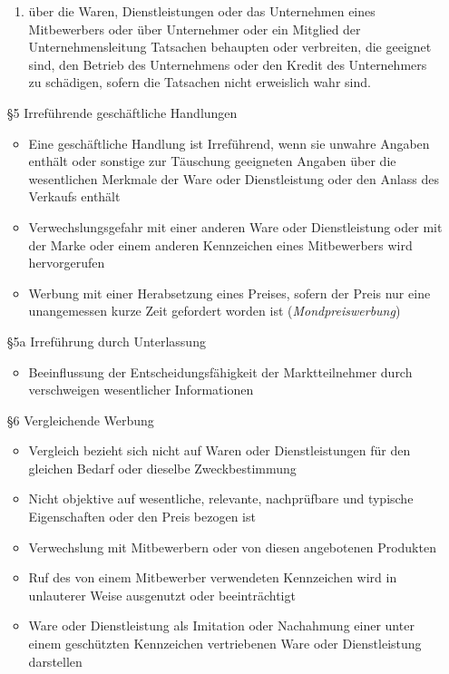 \begin{itemize}
\begin{enumerate}
				\item über die Waren, Dienstleistungen oder das Unternehmen eines Mitbewerbers oder über Unternehmer oder ein Mitglied der Unternehmensleitung Tatsachen behaupten oder verbreiten, die geeignet sind, den Betrieb des Unternehmens oder den Kredit des Unternehmers zu schädigen, sofern die Tatsachen nicht erweislich wahr sind.
			\end{enumerate}
	\item[§5] Irreführende geschäftliche Handlungen
		\begin{itemize}
			\item Eine geschäftliche Handlung ist Irreführend, wenn sie unwahre Angaben enthält oder sonstige zur Täuschung geeigneten Angaben über die wesentlichen Merkmale der Ware oder Dienstleistung oder den Anlass des Verkaufs enthält
			\item Verwechslungsgefahr mit einer anderen Ware oder Dienstleistung oder mit der Marke oder einem anderen Kennzeichen eines Mitbewerbers wird hervorgerufen
			\item Werbung mit einer Herabsetzung eines Preises, sofern der Preis nur eine unangemessen kurze Zeit gefordert worden ist ({\it Mondpreiswerbung})
		\end{itemize}
	\item[§5a] Irreführung durch Unterlassung
		\begin{itemize}
			\item Beeinflussung der Entscheidungsfähigkeit der Marktteilnehmer durch verschweigen wesentlicher Informationen
		\end{itemize}
	\item[§6] Vergleichende Werbung
		\begin{itemize}
			\item Vergleich bezieht sich nicht auf Waren oder Dienstleistungen für den gleichen Bedarf oder dieselbe Zweckbestimmung
			\item Nicht objektive auf wesentliche, relevante, nachprüfbare und typische Eigenschaften oder den Preis bezogen ist
			\item Verwechslung mit Mitbewerbern oder von diesen angebotenen Produkten
			\item Ruf des von einem Mitbewerber verwendeten Kennzeichen wird in unlauterer Weise ausgenutzt oder beeinträchtigt
			\item Ware oder Dienstleistung als Imitation oder Nachahmung einer unter einem geschützten Kennzeichen vertriebenen Ware oder Dienstleistung darstellen
		\end{itemize}

\end{itemize}
